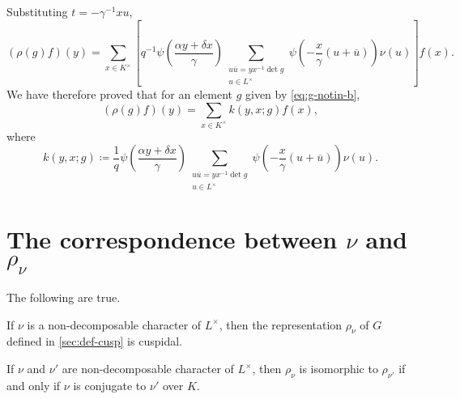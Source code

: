 \documentclass[../main.tex]{subfiles}
\begin{document}
Substituting $t=-\gamma^{-1}xu$,
\[(\rho(g)f)(y)=\sum_{x\in K^\times}\left[q^{-1}\psi\left(\frac{\alpha y+\delta x}\gamma\right)\sum_{\substack{u\overline u=yx^{-1}\det g\\u\in L^\times}}\psi\left(-\frac x\gamma(u+\overline u)\right)\nu(u)\right]f(x).\]
We have therefore proved that for an element $g$ given by \eqref{eq:g-notin-b},
\[(\rho(g)f)(y)=\sum_{x\in K^\times}k(y,x;g)f(x),\]
where
\[k(y,x;g)\coloneqq\frac1q\psi\left(\frac{\alpha y+\delta x}\gamma\right)\sum_{\substack{u\overline u=yx^{-1}\det g\\u\in L^\times}}\psi\left(-\frac x\gamma(u+\overline u)\right)\nu(u).\]

\section{The correspondence between \texorpdfstring{$\nu$}{ v} and \texorpdfstring{$\rho_\nu$}{ pv}}
\begin{proposition} \label{prop:cusp-reps}
	The following are true.
	\begin{listalph}
		\item If $\nu$ is a non-decomposable character of $L^\times$, then the representation $\rho_\nu$ of $G$ defined in \cref{sec:def-cusp} is cuspidal.
		\item If $\nu$ and $\nu'$ are non-decomposable character of $L^\times$, then $\rho_\nu$ is isomorphic to $\rho_{\nu'}$ if and only if $\nu$ is conjugate to $\nu'$ over $K$.
	\end{listalph}
\end{proposition}
\end{document}
